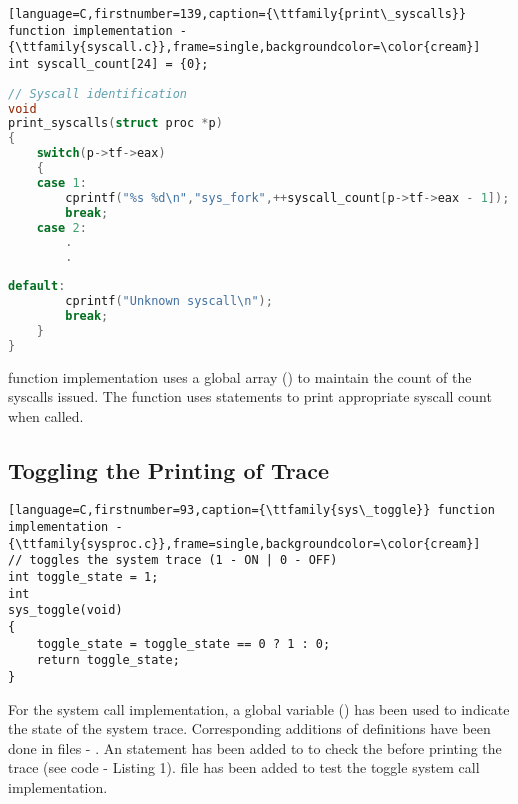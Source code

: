 \documentclass[12pt]{article}
\begin{document}
\begin{addmargin}[0.7in]{0in}
\begin{lstlisting}[language=C,firstnumber=139,caption={\ttfamily{print\_syscalls}} function implementation - {\ttfamily{syscall.c}},frame=single,backgroundcolor=\color{cream}]
int syscall_count[24] = {0};
\end{lstlisting}

\vspace{-\baselineskip}
\begin{lstlisting}[language=C,firstnumber=140,frame=single,backgroundcolor=\color{cream}]
// Syscall identification
void
print_syscalls(struct proc *p)
{
    switch(p->tf->eax)
    {
    case 1:
        cprintf("%s %d\n","sys_fork",++syscall_count[p->tf->eax - 1]);
        break;
    case 2:
        .
        .
\end{lstlisting}

\begin{lstlisting}[language=C,firstnumber=218,frame=single,backgroundcolor=\color{cream}]
    default:
        cprintf("Unknown syscall\n");
        break;
    }
}
\end{lstlisting}
\end{addmargin}

\vspace{5mm}
\begin{addmargin}[0.1in]{0in}
    {} function implementation uses a global array ({}) to maintain the count of the syscalls issued. The function uses {} statements to print appropriate syscall count when called.
\end{addmargin}

\subsection*{Toggling the Printing of Trace}
\begin{addmargin}[0.7in]{0in}
\begin{lstlisting}[language=C,firstnumber=93,caption={\ttfamily{sys\_toggle}} function implementation - {\ttfamily{sysproc.c}},frame=single,backgroundcolor=\color{cream}]
// toggles the system trace (1 - ON | 0 - OFF)
int toggle_state = 1;
int
sys_toggle(void)
{
    toggle_state = toggle_state == 0 ? 1 : 0;
    return toggle_state;
}
\end{lstlisting}
\end{addmargin}

\vspace{5mm}
\begin{addmargin}[0.1in]{0in}
    For the {} system call implementation, a global variable ({}) has been used to indicate the state of the system trace. Corresponding additions of definitions have been done in files - {}. An {} statement has been added to {} to check the {} before printing the trace (see code - Listing 1). {} file has been added to test the toggle system call implementation.
\end{addmargin}
\end{document}
